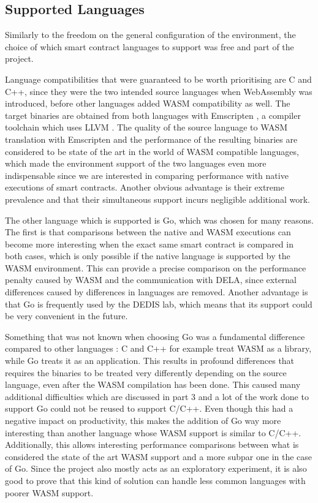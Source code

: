 \documentclass[11pt, a4paper, twoside, openright]{article}
\begin{document}
\subsection{Supported Languages}

Similarly to the freedom on the general configuration of the environment, the choice of which smart contract languages to support was free and part of the project.

Language compatibilities that were guaranteed to be worth prioritising are C and C++, since they were the two intended source languages when WebAssembly was introduced, before other languages added WASM compatibility as well. The target binaries are obtained from both languages with Emscripten \cite{emscripten}, a compiler toolchain which uses LLVM \cite{llvm}. The quality of the source language to WASM translation with Emscripten and the performance of the resulting binaries are considered to be state of the art in the world of WASM compatible languages, which made the environment support of the two languages even more indispensable since we are interested in comparing performance with native executions of smart contracts. Another obvious advantage is their extreme prevalence and that their simultaneous support incurs negligible additional work.

The other language which is supported is Go, which was chosen for many reasons. The first is that comparisons between the native and WASM executions can become more interesting when the exact same smart contract is compared in both cases, which is only possible if the native language is supported by the WASM environment. This can provide a precise comparison on the performance penalty caused by WASM and the communication with DELA, since external differences caused by differences in languages are removed. Another advantage is that Go is frequently used by the DEDIS lab, which means that its support could be very convenient in the future.

Something that was not known when choosing Go was a fundamental difference compared to other languages : C and C++ for example treat WASM as a library, while Go treats it as an application. This results in profound differences that requires the binaries to be treated very differently depending on the source language, even after the WASM compilation has been done. This caused many additional difficulties which are discussed in part 3 and a lot of the work done to support Go could not be reused to support C/C++. Even though this had a negative impact on productivity, this makes the addition of Go way more interesting than another language whose WASM support is similar to C/C++. Additionally, this allows interesting performance comparisons between what is considered the state of the art WASM support and a more subpar one in the case of Go. Since the project also mostly acts as an exploratory experiment, it is also good to prove that this kind of solution can handle less common languages with poorer WASM support.
\end{document}

